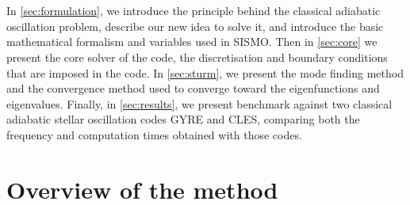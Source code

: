 \documentclass[]{aa}
\begin{document}
\\~\\In \autoref{sec:formulation}, we introduce the principle behind the classical adiabatic oscillation problem, describe our new idea to solve it, and introduce the basic mathematical formalism and variables used in SISMO. Then in \autoref{sec:core} we present the core solver of the code, the discretisation and boundary conditions that are imposed in the code. In \autoref{sec:sturm}, we present the mode finding method and the convergence method used to converge toward the eigenfunctions and eigenvalues. Finally, in \autoref{sec:results}, we present benchmark against two classical adiabatic stellar oscillation codes GYRE and CLES, comparing both the frequency and computation times obtained with those codes.

\section{Overview of the method}
\label{sec:formulation}
\end{document}
